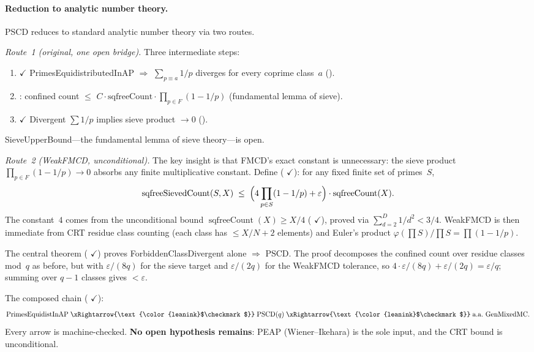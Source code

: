 \paragraph{Reduction to analytic number theory.}
PSCD reduces to standard analytic number theory via two routes.

\smallskip\noindent
\emph{Route~1 (original, one open bridge).}\enspace
Three intermediate steps:
\begin{enumerate}[nosep]
\item {\color{leanink}$\checkmark$}\enspace
  PrimesEquidistributedInAP $\Rightarrow$ $\sum_{p \equiv a} 1/p$ diverges
  for every coprime class~$a$
  ().
\item {}: confined count $\leq$ $C \cdot
  \text{sqfreeCount} \cdot \prod_{p \in F} (1 - 1/p)$
  (fundamental lemma of sieve).
\item {\color{leanink}$\checkmark$}\enspace
  Divergent $\sum 1/p$ implies sieve product $\to 0$
  ().
\end{enumerate}
SieveUpperBound---the fundamental lemma of sieve theory---is open.

\smallskip\noindent
\emph{Route~2 (WeakFMCD, unconditional).}\enspace
The key insight is that FMCD's exact constant is unnecessary:
the sieve product $\prod_{p \in F}(1-1/p) \to 0$ absorbs any
finite multiplicative constant.  Define 
(
{\color{leanink}$\checkmark$}):
for any fixed finite set of primes~$S$,
\[
  \operatorname{sqfreeSievedCount}(S,X) \;\leq\;
  \Bigl(4\prod_{p \in S}(1 - 1/p) + \varepsilon\Bigr)
  \cdot \operatorname{sqfreeCount}(X).
\]
The constant~$4$ comes from the unconditional bound
$\operatorname{sqfreeCount}(X) \geq X/4$
(
{\color{leanink}$\checkmark$}), proved via $\sum_{d=2}^{D}1/d^2 < 3/4$.
WeakFMCD is then immediate from CRT residue class counting
(each class has $\leq X/N + 2$ elements) and Euler's product
$\varphi(\prod S)/\prod S = \prod(1-1/p)$.

The central theorem
(
{\color{leanink}$\checkmark$})
proves ForbiddenClassDivergent alone $\Rightarrow$ PSCD\@.  The proof
decomposes the confined count over residue classes mod~$q$ as before,
but with $\varepsilon/(8q)$ for the sieve target and $\varepsilon/(2q)$
for the WeakFMCD tolerance, so $4 \cdot \varepsilon/(8q) + \varepsilon/(2q)
= \varepsilon/q$; summing over $q{-}1$ classes gives $< \varepsilon$.
\begin{keyresult}
The composed chain
(
{\color{leanink}$\checkmark$}):
\[
  \text{PrimesEquidistInAP}
  \;\xRightarrow{\text{\color{leanink}$\checkmark$}}\;
  \text{PSCD}(q)
  \;\xRightarrow{\text{\color{leanink}$\checkmark$}}\;
  \text{a.a.\ GenMixedMC}.
\]
Every arrow is machine-checked.  \textbf{No open hypothesis remains}:
PEAP (Wiener--Ikehara) is the sole input, and the CRT bound is
unconditional.
\end{keyresult}

